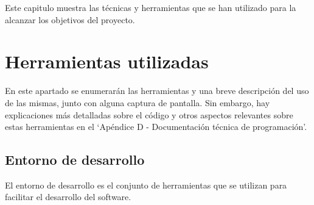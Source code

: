 
Este capitulo muestra las técnicas y herramientas que se han utilizado para la alcanzar los objetivos del proyecto. 

\section{Herramientas utilizadas}

En este apartado se enumerarán las herramientas y una breve descripción del uso de las mismas, junto con alguna captura de pantalla. Sin embargo, hay explicaciones más detalladas sobre el código y otros aspectos relevantes sobre estas herramientas en el `Apéndice D - Documentación técnica de programación'.

\subsection{Entorno de desarrollo}
El entorno de desarrollo es el conjunto de herramientas que se utilizan para facilitar el desarrollo del software.

